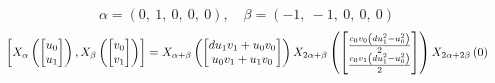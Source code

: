 \documentclass[11pt]{article}
\theoremstyle{definition}
\begin{document}
\[
\alpha = \left( 0, \  1, \  0, \  0, \  0\right), \quad \beta = \left( -1, \  -1, \  0, \  0, \  0\right)
\]
\[
\scaletoalign{\textwidth}{\left[ X_{\alpha}\left(\left[\begin{matrix}u_{0}\\u_{1}\end{matrix}\right]\right), X_{\beta}\left(\left[\begin{matrix}v_{0}\\v_{1}\end{matrix}\right]\right) \right] = X_{\alpha + \beta}\left(\left[\begin{matrix}d u_{1} v_{1} + u_{0} v_{0}\\u_{0} v_{1} + u_{1} v_{0}\end{matrix}\right]\right) X_{2\alpha + \beta}\left(\left[\begin{matrix}\frac{c_{0} v_{0} \left(d u_{1}^{2} - u_{0}^{2}\right)}{2}\\\frac{c_{0} v_{1} \left(d u_{1}^{2} - u_{0}^{2}\right)}{2}\end{matrix}\right]\right) X_{2\alpha + 2\beta}\left(0\right)}
\]
\end{document}
